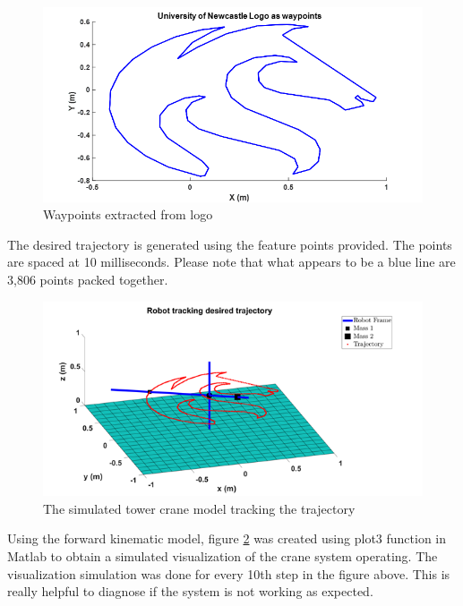 \documentclass{UoNMCHA}
\numberwithin{equation}{section}
\begin{document}
	\begin{figure}[H]
		\begin{center}
			\includegraphics[width=.8\linewidth]{figs/Picture23}
			\caption{Waypoints extracted from logo}
			\label{figs/Picture23}
		\end{center}
	\end{figure}
	
	The desired trajectory is generated using the feature points provided. The points are spaced at 10 milliseconds. Please note that what appears to be a blue line are 3,806 points packed together.
	
	\begin{figure}[H]
		\begin{center}
			\includegraphics[width=.9\linewidth]{figs/Picture24}
			\caption{The simulated tower crane model tracking the trajectory}
			\label{figs/Picture24}
		\end{center}
	\end{figure}
	
	Using the forward kinematic model, figure \ref{figs/Picture24} was created using plot3 function in Matlab to obtain a simulated visualization of the crane system operating. The visualization simulation was done for every 10th step in the figure above. This is really helpful to diagnose if the system is not working as expected. 
	
\end{document}
